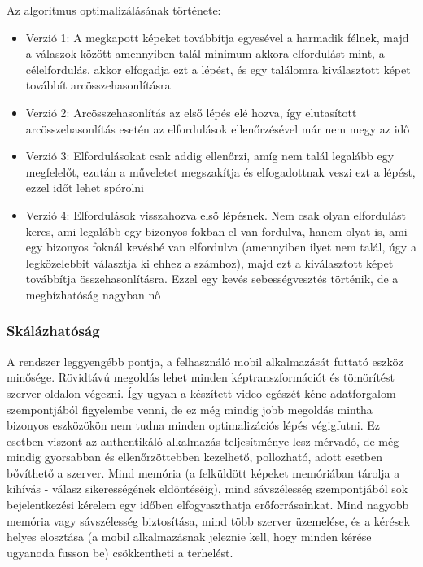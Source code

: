 Az algoritmus optimalizálásának története:
\begin{itemize}
\item Verzió 1: A megkapott képeket továbbítja egyesével a harmadik félnek, majd a válaszok között amennyiben talál minimum akkora elfordulást mint, a célelfordulás, akkor elfogadja ezt a lépést, és egy találomra kiválasztott képet továbbít arcösszehasonlításra
\item Verzió 2: Arcösszehasonlítás az első lépés elé hozva, így elutasított arcösszehasonlítás esetén az elfordulások ellenőrzésével már nem megy az idő
\item Verzió 3: Elfordulásokat csak addig ellenőrzi, amíg nem talál legalább egy megfelelőt, ezután a műveletet megszakítja és elfogadottnak veszi ezt a lépést, ezzel időt lehet spórolni
\item Verzió 4: Elfordulások visszahozva első lépésnek. Nem csak olyan elfordulást keres, ami legalább egy bizonyos fokban el van fordulva, hanem olyat is, ami egy bizonyos foknál kevésbé van elfordulva (amennyiben ilyet nem talál, úgy a legközelebbit választja ki ehhez a számhoz), majd ezt a kiválasztott képet továbbítja összehasonlításra. Ezzel egy kevés sebességvesztés történik, de a megbízhatóság nagyban nő
\end{itemize}

\subsubsection{Skálázhatóság}
A rendszer leggyengébb pontja, a felhasználó mobil alkalmazását futtató eszköz minősége. Rövidtávú megoldás lehet minden képtranszformációt és tömörítést szerver oldalon végezni. Így ugyan a készített video egészét kéne adatforgalom szempontjából figyelembe venni, de ez még mindig jobb megoldás mintha bizonyos eszközökön nem tudna minden optimalizációs lépés végigfutni.
Ez esetben viszont az authentikáló alkalmazás teljesítménye lesz mérvadó, de még mindig gyorsabban és ellenőrzöttebben kezelhető, pollozható, adott esetben bővíthető a szerver. Mind memória (a felküldött képeket memóriában tárolja a kihívás - válasz sikerességének eldöntéséig), mind sávszélesség szempontjából sok bejelentkezési kérelem egy időben elfogyaszthatja erőforrásainkat. Mind nagyobb memória vagy sávszélesség biztosítása, mind több szerver üzemelése, és a kérések helyes elosztása (a mobil alkalmazásnak jeleznie kell, hogy minden kérése ugyanoda fusson be) csökkentheti a terhelést.


